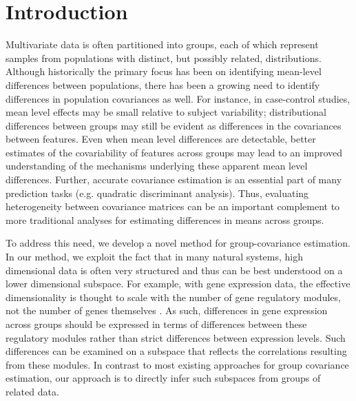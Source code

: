 \documentclass[12pt]{article}
\begin{document}
\section{Introduction}




Multivariate data is often partitioned into
groups, each of which represent samples from populations with
distinct, but possibly related, distributions.  Although historically the
primary focus has been on identifying mean-level differences between
populations, there has been a growing need to identify differences in
population covariances as well.  For instance, in case-control studies, mean level effects may be small relative to subject
variability; distributional differences between groups may still be
evident as differences in the covariances between features.  Even when
mean level differences are detectable, better estimates of the
covariability of features across groups may lead to an improved
understanding of the mechanisms underlying these apparent mean level
differences.  Further, accurate covariance estimation is an essential
part of many prediction tasks (e.g. quadratic discriminant analysis).
Thus, evaluating heterogeneity between covariance
matrices can be an important complement to more traditional analyses
for estimating differences in means across
groups.

To address this need, we develop a novel method for
group-covariance estimation.  In our method, we exploit the fact that
in many natural systems, high dimensional data is often very
structured and thus can be best understood on a lower dimensional
subspace. For example, with gene expression data, the effective
dimensionality is thought to scale with the number of gene regulatory
modules, not the number of genes themselves \citep{Heimberg2016}.  As
such, differences in gene expression across groups should be expressed
in terms of differences between these regulatory modules rather than
strict differences between expression levels.  Such differences can be
examined on a subspace that reflects the correlations resulting from
these modules.  In contrast to most existing approaches for group
covariance estimation, our approach is to directly infer such
subspaces from groups of related data.
\end{document}
